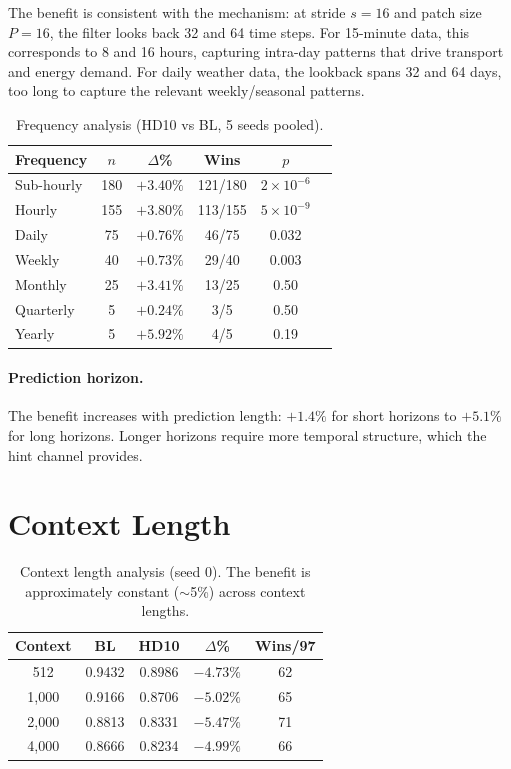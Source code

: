 \documentclass{article}
\begin{document}
The benefit is consistent with the mechanism: at stride $s=16$ and patch size $P=16$, the filter looks back 32 and 64 time steps. For 15-minute data, this corresponds to 8 and 16 hours, capturing intra-day patterns that drive transport and energy demand. For daily weather data, the lookback spans 32 and 64 days, too long to capture the relevant weekly/seasonal patterns.

\begin{table}[h]
\centering
\caption{Frequency analysis (HD10 vs BL, 5 seeds pooled).}
\small
\begin{tabular}{lccccc}
\toprule
\textbf{Frequency} & \textbf{$n$} & \textbf{$\Delta$\%} & \textbf{Wins} & \textbf{$p$} \\
\midrule
Sub-hourly & 180 & $+3.40\%$ & 121/180 & $2 \times 10^{-6}$ \\
Hourly & 155 & $+3.80\%$ & 113/155 & $5 \times 10^{-9}$ \\
Daily & 75 & $+0.76\%$ & 46/75 & 0.032 \\
Weekly & 40 & $+0.73\%$ & 29/40 & 0.003 \\
Monthly & 25 & $+3.41\%$ & 13/25 & 0.50 \\
Quarterly & 5 & $+0.24\%$ & 3/5 & 0.50 \\
Yearly & 5 & $+5.92\%$ & 4/5 & 0.19 \\
\bottomrule
\end{tabular}
\end{table}

\paragraph{Prediction horizon.} The benefit increases with prediction length: $+1.4\%$ for short horizons to $+5.1\%$ for long horizons. Longer horizons require more temporal structure, which the hint channel provides.

\section{Context Length}
\label{app:context}

\begin{table}[h]
\centering
\caption{Context length analysis (seed 0). The benefit is approximately constant ($\sim$5\%) across context lengths.}
\small
\begin{tabular}{ccccc}
\toprule
\textbf{Context} & \textbf{BL} & \textbf{HD10} & \textbf{$\Delta$\%} & \textbf{Wins/97} \\
\midrule
512 & 0.9432 & 0.8986 & $-4.73\%$ & 62 \\
1,000 & 0.9166 & 0.8706 & $-5.02\%$ & 65 \\
2,000 & 0.8813 & 0.8331 & $-5.47\%$ & 71 \\
4,000 & 0.8666 & 0.8234 & $-4.99\%$ & 66 \\
\bottomrule
\end{tabular}
\end{table}
\end{document}
